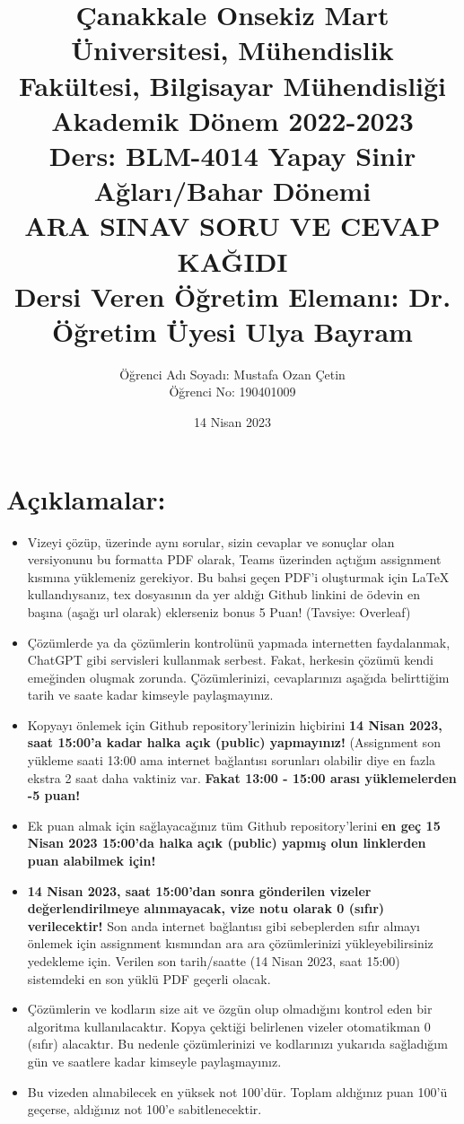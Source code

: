 \documentclass[11pt]{article}
\title{Çanakkale Onsekiz Mart Üniversitesi, Mühendislik Fakültesi, Bilgisayar Mühendisliği Akademik Dönem 2022-2023\\
Ders: BLM-4014 Yapay Sinir Ağları/Bahar Dönemi\\ 
ARA SINAV SORU VE CEVAP KAĞIDI\\
Dersi Veren Öğretim Elemanı: Dr. Öğretim Üyesi Ulya Bayram}
\author{%
\begin{minipage}{\textwidth}
\raggedright
Öğrenci Adı Soyadı: Mustafa Ozan Çetin\\ %
Öğrenci No: 190401009
\end{minipage}%
}
\date{14 Nisan 2023}
\begin{document}
\maketitle

\vspace{-.5in}
\section*{Açıklamalar:}
\begin{itemize}
    \item Vizeyi çözüp, üzerinde aynı sorular, sizin cevaplar ve sonuçlar olan versiyonunu bu formatta PDF olarak, Teams üzerinden açtığım assignment kısmına yüklemeniz gerekiyor. Bu bahsi geçen PDF'i oluşturmak için LaTeX kullandıysanız, tex dosyasının da yer aldığı Github linkini de ödevin en başına (aşağı url olarak) eklerseniz bonus 5 Puan! (Tavsiye: Overleaf)
    \item Çözümlerde ya da çözümlerin kontrolünü yapmada internetten faydalanmak, ChatGPT gibi servisleri kullanmak serbest. Fakat, herkesin çözümü kendi emeğinden oluşmak zorunda. Çözümlerinizi, cevaplarınızı aşağıda belirttiğim tarih ve saate kadar kimseyle paylaşmayınız. 
    \item Kopyayı önlemek için Github repository'lerinizin hiçbirini \textbf{14 Nisan 2023, saat 15:00'a kadar halka açık (public) yapmayınız!} (Assignment son yükleme saati 13:00 ama internet bağlantısı sorunları olabilir diye en fazla ekstra 2 saat daha vaktiniz var. \textbf{Fakat 13:00 - 15:00 arası yüklemelerden -5 puan!}
    \item Ek puan almak için sağlayacağınız tüm Github repository'lerini \textbf{en geç 15 Nisan 2023 15:00'da halka açık (public) yapmış olun linklerden puan alabilmek için!}
    \item \textbf{14 Nisan 2023, saat 15:00'dan sonra gönderilen vizeler değerlendirilmeye alınmayacak, vize notu olarak 0 (sıfır) verilecektir!} Son anda internet bağlantısı gibi sebeplerden sıfır almayı önlemek için assignment kısmından ara ara çözümlerinizi yükleyebilirsiniz yedekleme için. Verilen son tarih/saatte (14 Nisan 2023, saat 15:00) sistemdeki en son yüklü PDF geçerli olacak.
    \item Çözümlerin ve kodların size ait ve özgün olup olmadığını kontrol eden bir algoritma kullanılacaktır. Kopya çektiği belirlenen vizeler otomatikman 0 (sıfır) alacaktır. Bu nedenle çözümlerinizi ve kodlarınızı yukarıda sağladığım gün ve saatlere kadar kimseyle paylaşmayınız.
    \item Bu vizeden alınabilecek en yüksek not 100'dür. Toplam aldığınız puan 100'ü geçerse, aldığınız not 100'e sabitlenecektir.

\end{itemize}
\end{document}
